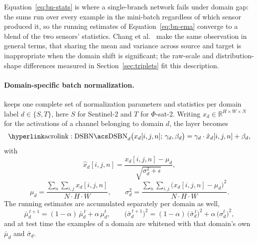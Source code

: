Equation~\eqref{eq:bn-stats} is where a single-branch network fails under domain gap: the sums run over every example in the mini-batch regardless of which sensor produced it, so the running estimates of Equation~\eqref{eq:bn-ema} converge to a blend of the two sensors' statistics.
Chang et al.\cite{chang2019dsbn}
\ make the same observation in general terms, that sharing the mean and variance across source and target is inappropriate when the domain shift is significant; the raw-scale and distribution-shape differences measured in Section~\ref{sec:triplets} fit this description.

\paragraph{Domain-specific batch normalization.}
 keeps one complete set of normalization parameters and statistics per domain label $d \in \{S, T\}$, here $S$ for Sentinel-2 and $T$ for $\Phi$-sat-2.
Writing $x_d \in \mathbb{R}^{H \times W \times N}$ for the activations of a channel belonging to domain $d$, the layer becomes
\begin{equation}
    \mathrm{\acref{DSBN}}_{d}\big(x_d[i,j,n];\, \gamma_d, \beta_d\big) = \gamma_d \cdot \hat{x}_d[i,j,n] + \beta_d,
    \label{eq:dsbn}
\end{equation}
with
\begin{equation}
    \hat{x}_d[i,j,n] = \frac{x_d[i,j,n] - \mu_d}{\sqrt{\sigma_d^{2} + \epsilon}},
    \label{eq:dsbn-whiten}
\end{equation}
\begin{equation}
    \mu_d = \frac{\sum_{n} \sum_{i,j} x_d[i,j,n]}{N \cdot H \cdot W},
    \qquad
    \sigma_d^{2} = \frac{\sum_{n} \sum_{i,j} \big(x_d[i,j,n] - \mu_d\big)^{2}}{N \cdot H \cdot W}.
    \label{eq:dsbn-stats}
\end{equation}
The running estimates are accumulated separately per domain as well,
\begin{equation}
    \bar{\mu}_d^{\,t+1} = (1 - \alpha)\,\bar{\mu}_d^{\,t} + \alpha\,\mu_d^{t},
    \qquad
    \big(\bar{\sigma}_d^{\,t+1}\big)^{2} = (1 - \alpha)\,\big(\bar{\sigma}_d^{\,t}\big)^{2} + \alpha\,\big(\sigma_d^{t}\big)^{2},
    \label{eq:dsbn-ema}
\end{equation}
and at test time the examples of a domain are whitened with that domain's own $\bar{\mu}_d$ and $\bar{\sigma}_d$.

